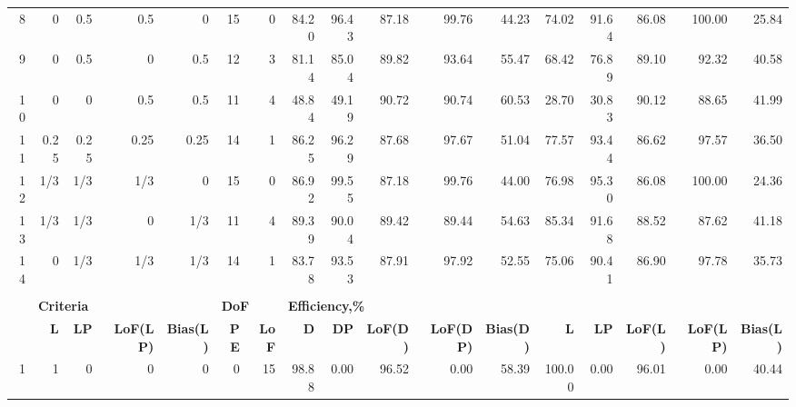 \begin{landscape}
\begin{table}[p]
{\begin{tabular}{rrrrrrrrrrrrrrrrr}
8 & 0 & 0.5 & 0.5 & 0 & \multicolumn{1}{|r}{15} & 0 & \multicolumn{1}{|r}{84.20} & 96.43 & 87.18 & 99.76 & 44.23 & \multicolumn{1}{|r}{74.02} & 91.64 & 86.08 & 100.00 & 25.84 \\
9 & 0 & 0.5 & 0 & 0.5 & \multicolumn{1}{|r}{12} & 3 & \multicolumn{1}{|r}{81.14} & 85.04 & 89.82 & 93.64 & 55.47 & \multicolumn{1}{|r}{68.42} & 76.89 & 89.10 & 92.32 & 40.58 \\
10 & 0 & 0 & 0.5 & 0.5 & \multicolumn{1}{|r}{11} & 4 & \multicolumn{1}{|r}{48.84} & 49.19 & 90.72 & 90.74 & 60.53 & \multicolumn{1}{|r}{28.70} & 30.83 & 90.12 & 88.65 & 41.99 \\
11 & 0.25 & 0.25 & 0.25 & 0.25 & \multicolumn{1}{|r}{14} & 1 & \multicolumn{1}{|r}{86.25} & 96.29 & 87.68 & 97.67 & 51.04 & \multicolumn{1}{|r}{77.57} & 93.44 & 86.62 & 97.57 & 36.50 \\
12 & 1/3 & 1/3 & 1/3 & 0 & \multicolumn{1}{|r}{15} & 0 & \multicolumn{1}{|r}{86.92} & 99.55 & 87.18 & 99.76 & 44.00 & \multicolumn{1}{|r}{76.98} & 95.30 & 86.08 & 100.00 & 24.36 \\
13 & 1/3 & 1/3 & 0 & 1/3 & \multicolumn{1}{|r}{11} & 4 & \multicolumn{1}{|r}{89.39} & 90.04 & 89.42 & 89.44 & 54.63 & \multicolumn{1}{|r}{85.34} & 91.68 & 88.52 & 87.62 & 41.18 \\
14 & 0 & 1/3 & 1/3 & 1/3 & \multicolumn{1}{|r}{14} & 1 & \multicolumn{1}{|r}{83.78} & 93.53 & 87.91 & 97.92 & 52.55 & \multicolumn{1}{|r}{75.06} & 90.41 & 86.90 & 97.78 & 35.73 \\
 &  &  &  &  &  &  &  &  &  &  &  &  &  &  &  &  \\
\multicolumn{1}{l}{} & \multicolumn{4}{l}{{\bf Criteria}} & \multicolumn{2}{l}{{\bf DoF}} & \multicolumn{10}{l}{{\bf Efficiency,\%}} \\
\multicolumn{1}{l}{} & \multicolumn{1}{r}{{\bf L}} & \multicolumn{1}{r}{{\bf LP}} & \multicolumn{1}{r}{{\bf LoF(LP)}} & \multicolumn{1}{r}{{\bf Bias(L)}}  & \multicolumn{1}{r}{{\bf PE}} & \multicolumn{1}{r}{{\bf LoF}} & \multicolumn{1}{r}{{\bf D}} & \multicolumn{1}{r}{{\bf DP}} & \multicolumn{1}{r}{{\bf LoF(D)}} & \multicolumn{1}{r}{{\bf LoF(DP)}} & \multicolumn{1}{r}{{\bf Bias(D)}} & \multicolumn{1}{r}{{\bf L}} & \multicolumn{1}{r}{{\bf LP}} & \multicolumn{1}{r}{{\bf LoF(L)}} & \multicolumn{1}{r}{{\bf LoF(LP)}} & \multicolumn{1}{r}{{\bf Bias(L)}} \\
1 & 1 & 0 & 0 & 0 & \multicolumn{1}{|r}{0} & 15 & \multicolumn{1}{|r}{98.88} & 0.00 & 96.52 & 0.00 & 58.39 & \multicolumn{1}{|r}{100.00} & 0.00 & 96.01 & 0.00 & 40.44 \\

\end{tabular}}
\end{table}
\end{landscape}
